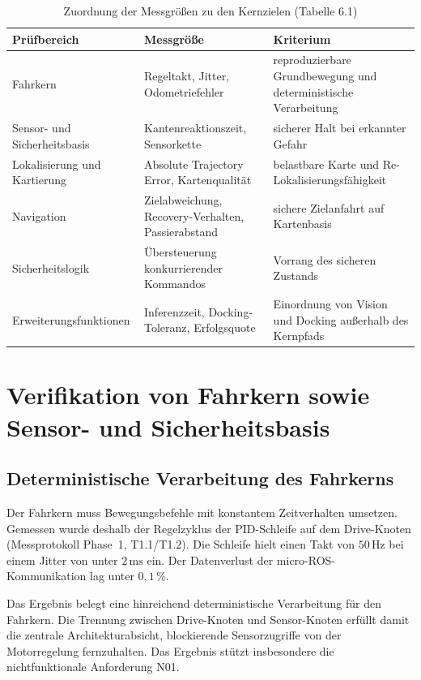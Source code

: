 \begin{table}[htbp]
  \centering
  \caption{Zuordnung der Messgrößen zu den Kernzielen (Tabelle 6.1)}
  \small
  \begin{tabularx}{\textwidth}{l l L}
    \toprule
    \textbf{Prüfbereich} & \textbf{Messgröße} & \textbf{Kriterium} \\
    \midrule
    Fahrkern & Regeltakt, Jitter, Odometriefehler & reproduzierbare Grundbewegung und deterministische Verarbeitung \\
    \addlinespace
    Sensor- und Sicherheitsbasis & Kantenreaktionszeit, Sensorkette & sicherer Halt bei erkannter Gefahr \\
    \addlinespace
    Lokalisierung und Kartierung & Absolute Trajectory Error, Kartenqualität & belastbare Karte und Re-Lokalisierungsfähigkeit \\
    \addlinespace
    Navigation & Zielabweichung, Recovery-Verhalten, Passierabstand & sichere Zielanfahrt auf Kartenbasis \\
    \addlinespace
    Sicherheitslogik & Übersteuerung konkurrierender Kommandos & Vorrang des sicheren Zustands \\
    \addlinespace
    Erweiterungsfunktionen & Inferenzzeit, Docking-Toleranz, Erfolgsquote & Einordnung von Vision und Docking außerhalb des Kernpfads \\
    \bottomrule
  \end{tabularx}
\end{table}

\section{Verifikation von Fahrkern sowie Sensor- und Sicherheitsbasis}

\subsection{Deterministische Verarbeitung des Fahrkerns}

Der Fahrkern muss Bewegungsbefehle mit konstantem Zeitverhalten umsetzen. Gemessen wurde deshalb der Regelzyklus der PID-Schleife auf dem Drive-Knoten (Messprotokoll Phase~1, T1.1/T1.2). Die Schleife hielt einen Takt von $50\,\mathrm{Hz}$ bei einem Jitter von unter $2\,\mathrm{ms}$ ein. Der Datenverlust der micro-ROS-Kommunikation lag unter $0{,}1\,\%$.

Das Ergebnis belegt eine hinreichend deterministische Verarbeitung für den Fahrkern. Die Trennung zwischen Drive-Knoten und Sensor-Knoten erfüllt damit die zentrale Architekturabsicht, blockierende Sensorzugriffe von der Motorregelung fernzuhalten. Das Ergebnis stützt insbesondere die nichtfunktionale Anforderung N01.

